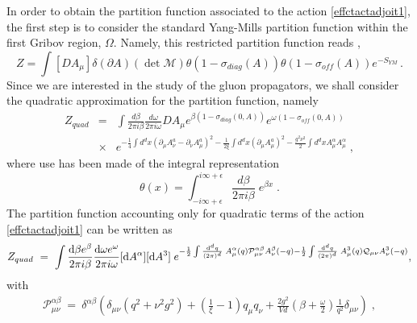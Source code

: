 In order to obtain the partition function associated to the action \eqref{effctactadjoit1}, the
first step is to consider the standard Yang-Mills partition function within the first Gribov
region, $\Omega$. Namely, this restricted partition function reads
\cite{Gribov:1977wm,Sobreiro:2005ec,Vandersickel:2012tz},
\begin{equation}
Z=\int {[DA_{\mu }]\delta (\partial A)(\det\mathcal{M})\theta (1-\sigma
_{diag}(A))\theta (1-\sigma _{off}(A))e^{-S_{YM}}}\,.
\end{equation}
Since we are interested in the study of the gluon propagators, we shall consider the quadratic
approximation for the partition function, namely  
\begin{eqnarray}
Z_{quad} &=&\int \frac{d\beta }{2\pi i\beta }\frac{d\omega }{2\pi i\omega }%
DA_{\mu }e^{\beta (1-\sigma _{diag}(0,A))}e^{\omega \left( 1-\sigma
_{off}(0,A)\right) }  \nonumber  \label{Zq} \\
&\times &e^{-\frac{1}{4}\int d^{d}x(\partial _{\mu }A_{\nu }^{a}-\partial
_{\nu }A_{\mu }^{a})^{2}-\frac{1}{2\xi }\int {d^{d}x(\partial _{\mu }A_{\mu
}^{a})^{2}-}\frac{{g^{2}\nu ^{2}}}{2}\int {d^{d}xA_{\mu }^{\alpha }A_{\mu
}^{\alpha }}} \;,
\end{eqnarray}
where use has been made of the integral representation
\begin{equation}
\theta(x) = \int_{-i \infty +\epsilon}^{i\infty +\epsilon} \frac{d\beta}{2\pi i \beta} \; e^{\beta x}  \;. \label{step}
\end{equation}
The partition function accounting only for quadratic terms of the action
\eqref{effctactadjoit1} can be written as
\begin{equation}
Z_{quad} ~=~ \int \frac{\mathrm{d}\beta e^{\beta }}{2\pi i\beta }\frac{\mathrm{d}\omega e^{\omega }} {2\pi i\omega }[\mathrm{d} A^{\alpha }][\mathrm{d} A^{3}] \; e^{-\frac{1}{2}  \int \frac{\mathrm{d}^{d}q}{(2\pi )^{d}}  \;  A_{\mu }^{\alpha }(q)\mathcal{P}_{\mu \nu }^{\alpha
\beta }A_{\nu }^{\beta }(-q)-\frac{1}{2}  \int \frac{\mathrm{d}^{d}q}{(2\pi )^{d}} \;  A_{\mu }^{3}(q)\mathcal{Q}_{\mu \nu }A_{\nu }^{3}(-q)},  
\label{Zq1}
\end{equation}
with
\begin{eqnarray}
\mathcal{P}_{\mu \nu }^{\alpha \beta } ~=~  \delta^{\alpha \beta } \left(\delta _{\mu \nu }
\left( q^{2}+\nu^{2}g^{2}\right) +\left( \frac{1}{\xi } -1 \right) q_{\mu }q_{\nu } +
\frac{2g^{2}}{Vd}\left( \beta +\frac{\omega }{2} \right) \frac{1}{q^{2}}\delta _{\mu \nu
}\right)  \label{P}  \;,
\end{eqnarray}
